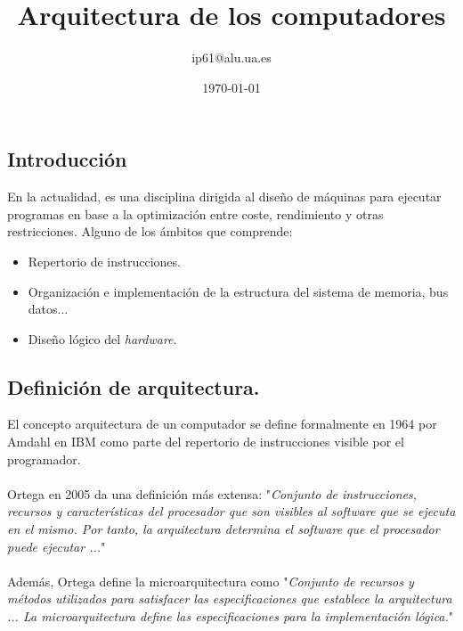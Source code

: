 \documentclass{article}
\title{Arquitectura de los computadores}
\author{ip61@alu.ua.es}
\date{\today}
\begin{document}
	\maketitle
	
	\begin{multicols}{2}
	\section{Introducción}
		En la actualidad, es una disciplina dirigida al diseño de máquinas para ejecutar programas en base a la optimización entre coste, rendimiento y otras restricciones. Alguno de los ámbitos que comprende:
		\begin{itemize}
			\item Repertorio de instrucciones.
			\item Organización e implementación de la estructura del sistema de memoria, bus datos...
			\item Diseño lógico del \textit{hardware}.
		\end{itemize}
		
		\subsection{Definición de arquitectura.}

		El concepto arquitectura de un computador se define formalmente en 1964 por Amdahl en IBM como parte del repertorio de instrucciones visible por el programador.
		\paragraph{}
		Ortega en 2005 da una definición más extensa: "\textit{Conjunto de instrucciones, recursos y características del procesador que son visibles al software que se ejecuta en el mismo. Por tanto, la arquitectura determina el software que el procesador puede ejecutar ...}" 
		\paragraph{}
		Además, Ortega define la microarquitectura como "\textit{Conjunto de recursos y métodos utilizados para satisfacer las especificaciones que establece la arquitectura ... La microarquitectura define las especificaciones para la implementación lógica.}"
		


\end{multicols}
\end{document}
